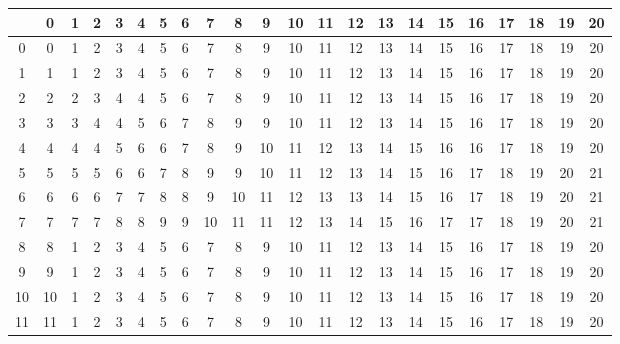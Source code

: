 \documentclass[10pt]{article}
\begin{document}
\pagestyle{empty}

\def\tl{\underline{\phantom{39}}}




\setlength\extrarowheight{5pt}

\begin{table}[ht]
  \centering
  \begin{tabular}{c|ccc|ccc|ccc|ccc|ccc|ccc|ccc}
    \hline
      & 0 & 1 & 2 & 3 & 4 & 5 & 6 & 7 & 8 & 9 & 10 & 11 & 12 & 13 & 14 & 15 & 16 & 17 & 18 & 19 & 20\\\hline

    \rowcolor{LightCyan}
    0 & 0 & 1 & 2 & 3 & 4 & 5 & 6 & 7 & 8 & 9 & 10 & 11 & 12 & 13 & 14 & 15 & 16 & 17 & 18 & 19 & 20\\
    \rowcolor{LightCyan}
    1 & 1 & 1 & 2 & 3 & 4 & 5 & 6 & 7 & 8 & 9 & 10 & 11 & 12 & 13 & 14 & 15 & 16 & 17 & 18 & 19 & 20\\
    \rowcolor{LightCyan}
    2 & 2 & 2 & 3 & 4 & 4 & 5 & 6 & 7 & 8 & 9 & 10 & 11 & 12 & 13 & 14 & 15 & 16 & 17 & 18 & 19 & 20\\

    3 & 3 & 3 & 4 & 4 & 5 & 6 & 7 & 8 & 9 & 9 & 10 & 11 & 12 & 13 & 14 & 15 & 16 & 17 & 18 & 19 & 20\\
    4 & 4 & 4 & 4 & 5 & 6 & 6 & 7 & 8 & 9 & 10 & 11 & 12 & 13 & 14 & 15 & 16 & 16 & 17 & 18 & 19 & 20\\
    5 & 5 & 5 & 5 & 6 & 6 & 7 & 8 & 9 & 9 & 10 & 11 & 12 & 13 & 14 & 15 & 16 & 17 & 18 & 19 & 20 & 21\\

    \rowcolor{LightCyan}
    6 & 6 & 6 & 6 & 7 & 7 & 8 & 8 & 9 & 10 & 11 & 12 & 13 & 13 & 14 & 15 & 16 & 17 & 18 & 19 & 20 & 21\\
    \rowcolor{LightCyan}
    7 & 7 & 7 & 7 & 8 & 8 & 9 & 9 & 10 & 11 & 11 & 12 & 13 & 14 & 15 & 16 & 17 & 17 & 18 & 19 & 20 & 21\\
    \rowcolor{LightCyan}
    8 & 8 & 1 & 2 & 3 & 4 & 5 & 6 & 7 & 8 & 9 & 10 & 11 & 12 & 13 & 14 & 15 & 16 & 17 & 18 & 19 & 20\\

    9 & 9 & 1 & 2 & 3 & 4 & 5 & 6 & 7 & 8 & 9 & 10 & 11 & 12 & 13 & 14 & 15 & 16 & 17 & 18 & 19 & 20\\
    10 & 10 & 1 & 2 & 3 & 4 & 5 & 6 & 7 & 8 & 9 & 10 & 11 & 12 & 13 & 14 & 15 & 16 & 17 & 18 & 19 & 20\\
    11 & 11 & 1 & 2 & 3 & 4 & 5 & 6 & 7 & 8 & 9 & 10 & 11 & 12 & 13 & 14 & 15 & 16 & 17 & 18 & 19 & 20\\


\end{tabular}
\end{table}
\end{document}
